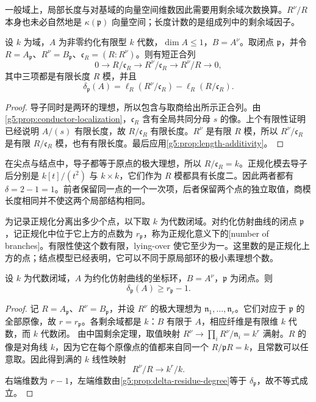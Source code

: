 一般域上，局部长度与对基域的向量空间维数因此需要用剩余域次数换算。\(R^\nu/R\) 本身也未必自然地是 \(\kappa(\mathfrak p)\) 向量空间；长度计数的是组成列中的剩余域因子。

\begin{proposition}\label{g5:prop:conductor-colength}
	设 \(k\) 为域，\(A\) 为非零约化有限型 \(k\) 代数，\(\dim A\leq1\)，\(B=A^\nu\)。取闭点 \(\mathfrak p\)，并令 \(R=A_{\mathfrak p}\)、\(R^\nu=B_{\mathfrak p}\)、\(\mathfrak c_R=(R:R^\nu)\)。则有短正合列
	\[
	0\longrightarrow R/\mathfrak c_R
	\longrightarrow R^\nu/\mathfrak c_R
	\longrightarrow R^\nu/R\longrightarrow0,
	\]
	其中三项都是有限长度 \(R\) 模，并且
	\[
	\delta_{\mathfrak p}(A)
	=\ell_R(R^\nu/\mathfrak c_R)
	-\ell_R(R/\mathfrak c_R).
	\]
\end{proposition}
\begin{proof}
	导子同时是两环的理想，所以包含与取商给出所示正合列。由\cref{g5:prop:conductor-localization}，\(\mathfrak c_R\) 含有全局共同分母 \(s\) 的像。上个有限性证明已经说明 \(A/(s)\) 有限长度，故 \(R/\mathfrak c_R\) 有限长度。\(R^\nu\) 是有限 \(R\) 模，所以 \(R^\nu/\mathfrak c_R\) 是有限 \(R/\mathfrak c_R\) 模，也有有限长度。最后应用\cref{g5:prop:length-additivity}。
\end{proof}

在尖点与结点中，导子都等于原点的极大理想，所以 \(R/\mathfrak c_R=k\)。正规化模去导子后分别是 \(k[t]/(t^2)\) 与 \(k\times k\)，它们作为 \(R\) 模都具有长度二。因此两者都有 \(\delta=2-1=1\)。前者保留同一点的一个一次项，后者保留两个点的独立取值，商模长度相同并不使这两个局部结构相同。

\ProseParagraphBreak

为记录正规化分离出多少个点，以下取 \(k\) 为代数闭域。对约化仿射曲线的闭点 \(\mathfrak p\)，记正规化中位于它上方的点数为 \(r_{\mathfrak p}\)，称为正规化意义下的[number of branches]。有限性使这个数有限，lying-over 使它至少为一。这里数的是正规化上方的点；结点模型已经表明，它可以不同于原局部环的极小素理想个数。

\begin{proposition}\label{g5:prop:delta-branch-bound}
	设 \(k\) 为代数闭域，\(A\) 为约化仿射曲线的坐标环，\(B=A^\nu\)，\(\mathfrak p\) 为闭点。则
	\[
	\delta_{\mathfrak p}(A)\geq r_{\mathfrak p}-1.
	\]
\end{proposition}
\begin{proof}
	记 \(R=A_{\mathfrak p}\)、\(R^\nu=B_{\mathfrak p}\)，并设 \(R^\nu\) 的极大理想为 \(\mathfrak n_1,\ldots,\mathfrak n_r\)。它们对应于 \(\mathfrak p\) 的全部原像，故 \(r=r_{\mathfrak p}\)。各剩余域都是 \(k\)：\(B\) 有限于 \(A\)，相应纤维是有限维 \(k\) 代数，而 \(k\) 代数闭。
	由中国剩余定理，取值映射 \(R^\nu\rightarrow\prod_iR^\nu/\mathfrak n_i=k^r\) 满射。\(R\) 的像是对角线 \(k\)，因为它在每个原像点的值都来自同一个 \(R/\mathfrak pR=k\)，且常数可以任意取。因此得到满的 \(k\) 线性映射
	\[
	R^\nu/R\longrightarrow k^r/k.
	\]
	右端维数为 \(r-1\)，左端维数由\cref{g5:prop:delta-residue-degree}等于 \(\delta_{\mathfrak p}\)，故不等式成立。
\end{proof}

